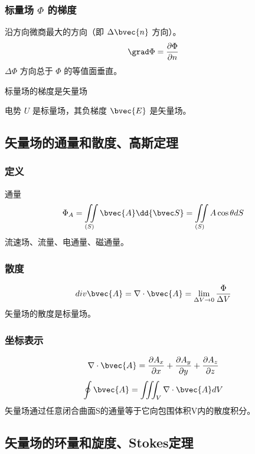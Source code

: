 \subsubsection{标量场 $\Phi$ 的梯度}
沿方向微商最大的方向（即 $\Delta \bvec{n}$ 方向）。
\begin{equation}\label{VecAnl_eq5}
\grad \Phi = \frac{\partial \Phi}{\partial n}
\end{equation}
$\Delta \Phi$ 方向总于 $\Phi$ 的等值面垂直。

标量场的梯度是矢量场

电势 $U$ 是标量场，其负梯度 $\bvec{E}$ 是矢量场。

\subsection{矢量场的通量和散度、高斯定理}%
\subsubsection{定义}
通量
\begin{equation}\label{VecAnl_eq6}
\Phi_A=\iint\limits_{(S)} \bvec{A} \dd{\bvec S} = \iint\limits_{(S)} A\cos\theta dS
\end{equation}
流速场、流量、电通量、磁通量。

\subsubsection{散度}
\begin{equation}\label{VecAnl_eq7}
div \bvec{A}=\nabla \cdot \bvec{A}=\lim_{\Delta V \to 0}\frac{\Phi}{\Delta V}
\end{equation}
矢量场的散度是标量场。

\subsubsection{坐标表示}
\begin{equation}\label{VecAnl_eq8}
\nabla \cdot \bvec{A}= \frac{\partial A_x}{\partial x}+\frac{\partial A_y}{\partial y}+\frac{\partial A_z}{\partial z}
\end{equation}
\begin{equation}\label{VecAnl_eq9}
\oint \bvec{A}=\iiint_V \nabla \cdot \bvec{A} dV
\end{equation}
矢量场通过任意闭合曲面S的通量等于它向包围体积V内的散度积分。
\subsection{矢量场的环量和旋度、Stokes定理}%

